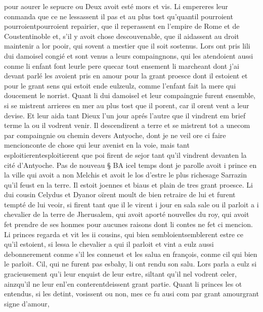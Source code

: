 \documentclass{article}
\begin{document}
\begin{pages}
   pour aourer le sepucre ou Deux avoit esté mors et vis. 
   Li empereres leur conmanda que ce ne lessassent il pas et 
      au plus tost qu’quantil 
      pourroient
         pourroientpourroient repairier, que il reperassent en l’empire 
      de Rome et de Coustentinoble et, s’il y avoit chose 
      descouvenable, que il aidassent au droit 
      maintenir a lor pooir, qui sovent a mestier que il soit sostenus. 
   Lors ont pris lili dui damoisel congié et sont venus a leurs compaingnons, 
   qui les atendoient aussi conme 
   li enfant font 
   leurle pere 
   quecar tout ensement li marcheant 
   dont j’ai devant parlé les avoient pris en amour pour la grant proesce 
   dont il estoient et pour le 
   grant sens 
   qui estoit ende eulzeulz,
   comme l'enfant fait la mere qui doucement le norrist. \pend 
\pstart Quant li dui damoisel et leur compaingnie furent ensemble, si se mistrent arrieres en mer au plus tost 
   que il porent, car il orent vent a leur devise. Et leur aida tant Dieux l’un jour aprés l’autre que il vindrent em brief terme la ou il 
   vodrent venir. Il descendirent a terre et se mistrent tot a unecom par 
   compaingnie ou chemin devers Antyoche, dont je ne veil ore ci faire 
      mencionconte de chose qui leur avenist en la voie, mais tant 
   esploitierentesploitierent que poi firent de sejor tant qu’il vindrent 
   devanten la cité 
   d’Antyoche. \pend
\pstart Pas de nouveau § BA icel temps dont je parolle avoit 
   i prince en la ville qui avoit a non Melchis et avoit le los d’estre le plus 
   richesage Sarrazin qu’il feust en la terre. 
   Il estoit joennes et biaus et plain de tres grant proesce. Li dui cousin Celydus et 
   Dyanor oïrent moult de bien retraire de lui et furent tempté de lui veoir, 
   si firent tant que il le virent i jour en sala sale 
   ou il parloit a i chevalier de la terre de 
   Jherusalem, qui avoit aporté nouvelles du roy, 
   qui avoit fet prendre de ses honmes pour aucunes raisons dont li contes ne fet ci mencion. 
   Li princes regarda et vit les ii cousins, qui bien 
   sembloientsemblerent estre ce qu’il estoient, 
   si lessa le chevalier a qui il parloit et vint a eulz aussi debonnerement conme s’il les conneust et les salua en françois, 
   conme cil qui bien le parloit. Cil, qui ne furent pas esbahy, li ont rendu son salu. 
   Lors parla a eulz si gracieusement qu’i leur enquist de leur estre, 
      siltant qu'il nel vodrent celer, 
   ainzqu'il ne 
   leur enl'en 
      conterentdeissent grant partie. \pend 
\pstart Quant li princes les ot entendus, si les detint, 
   vosissent ou non, mes ce fu ausi com par grant amourgrant signe d'amour, 

\end{pages}
\end{document}
